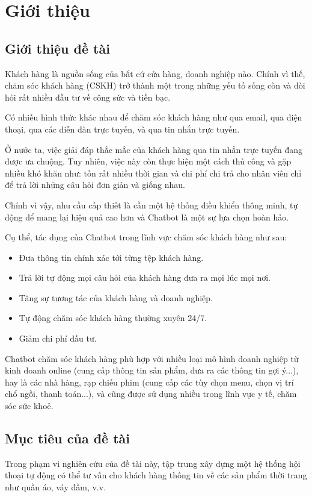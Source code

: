 \chapter {Giới thiệu}

\section{Giới thiệu đề tài}
Khách hàng là nguồn sống của bất cứ cửa hàng, doanh nghiệp nào.
Chính vì thế, chăm sóc khách hàng (CSKH) trở thành một trong những
yếu tố sống còn và đòi hỏi rất nhiều đầu tư về công sức và tiền bạc.

Có nhiều hình thức khác nhau để chăm sóc khách hàng như qua email,
qua điện thoại, qua các diễn đàn trực tuyến, và qua tin nhắn trực tuyến.

Ở nước ta, việc giải đáp thắc mắc của khách hàng qua tin nhắn trực tuyến
đang được ưa chuộng. Tuy nhiên, việc này còn thực hiện một cách thủ công
và gặp nhiều khó khăn như: tốn rất nhiều thời gian và chi phí chi trả
cho nhân viên chỉ để trả lời những câu hỏi đơn giản và giống nhau.

Chính vì vậy, nhu cầu cấp thiết là cần một hệ thống điều khiển thông minh,
tự động để mang lại hiệu quả cao hơn và Chatbot là một sự lựa chọn hoàn hảo.

Cụ thể, tác dụng của Chatbot trong lĩnh vực chăm sóc khách hàng như sau:

\begin{itemize}
    \item Đưa thông tin chính xác tới từng tệp khách hàng.
    \item Trả lời tự động mọi câu hỏi của khách hàng đưa ra mọi lúc mọi nơi.
    \item Tăng sự tương tác của khách hàng và doanh nghiệp.
    \item Tự động chăm sóc khách hàng thường xuyên 24/7.
    \item Giảm chi phí đầu tư.
\end{itemize}

Chatbot chăm sóc khách hàng phù hợp với nhiều loại mô hình doanh nghiệp
từ kinh doanh online (cung cấp thông tin sản phẩm, đưa ra các thông tin
gợi ý...), hay là các nhà hàng, rạp chiếu phim (cung cấp các tùy chọn
menu, chọn vị trí chổ ngồi, thanh toán...), và cũng được sử dụng nhiều
trong lĩnh vực y tế, chăm sóc sức khoẻ.

\section{Mục tiêu của đề tài}
\label{sec:muctieu}
Trong phạm vi nghiên cứu của đề tài này, tập trung xây dựng một hệ thống
hội thoại tự động có thể tư vấn cho khách hàng thông tin về các sản phẩm
thời trang như quần áo, váy đầm, v.v.

